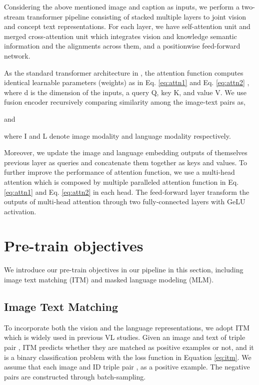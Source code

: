 \documentclass{article}
\begin{document}
Considering the above mentioned image  and caption  as inputs, we perform a two-stream transformer pipeline consisting of stacked multiple layers to joint vision and concept text representations. For each layer, we have self-attention unit and merged cross-attention unit which integrates vision and knowledge semantic information and the alignments across them, and a positionwise feed-forward network. 

As the standard transformer architecture in \cite{vaswani2017attention}, the attention function computes identical learnable parameters (weights) as in Eq. \ref{eq:attn1} and Eq. \ref{eq:attn2} , where d is the dimension of the inputs, a query Q, key K, and value V. We use fusion encoder recursively comparing similarity among the image-text pairs as, 
 

and 

 

where I and L denote image modality and language modality respectively.

Moreover, we update the image and language embedding outputs of themselves previous layer as queries and concatenate them together as keys and values. To further improve the performance of attention function, we use a multi-head attention which is composed by multiple paralleled attention function in Eq. \ref{eq:attn1} and Eq. \ref{eq:attn2} in each head. The feed-forward layer transform the outputs of multi-head attention through two fully-connected layers with GeLU activation.

\section{Pre-train objectives} \label{ap:pre-train}
We introduce our pre-train objectives in our pipeline in this section, including image text matching (ITM) and masked language modeling (MLM).  

\subsection{Image Text Matching} 

To incorporate both the vision and the language representations, we adopt ITM which is widely used in previous VL studies. Given an image and text of triple pair , ITM predicts whether they are matched as positive examples or not, and it is a binary classification problem with the loss function in Equation \ref{eq:itm}. We assume that each image and ID triple pair , as a positive example. The negative pairs are constructed through batch-sampling. 
\end{document}
